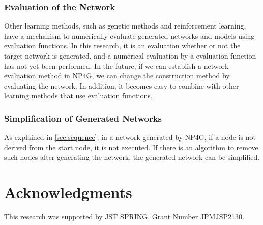 \documentclass{article}
\begin{document}
\subsubsection {Evaluation of the Network}
Other learning methods, such as genetic methods and reinforcement learning, have a mechanism to numerically evaluate generated networks and models using evaluation functions.
In this research, it is an evaluation whether or not the target network is generated, and a numerical evaluation by a evaluation function has not yet been performed.
In the future, if we can establish a network evaluation method in NP4G, we can change the construction method by evaluating the network.
In addition, it becomes easy to combine with other learning methods that use evaluation functions.

\subsubsection {Simplification of Generated Networks}
As explained in \ref{sec:sequence}, in a network generated by NP4G, if a node is not derived from the start node, it is not executed.
If there is an algorithm to remove such nodes after generating the network, the generated network can be simplified.

\section*{Acknowledgments}
This research was supported by JST SPRING, Grant Number JPMJSP2130.

  
  
\end{document}
